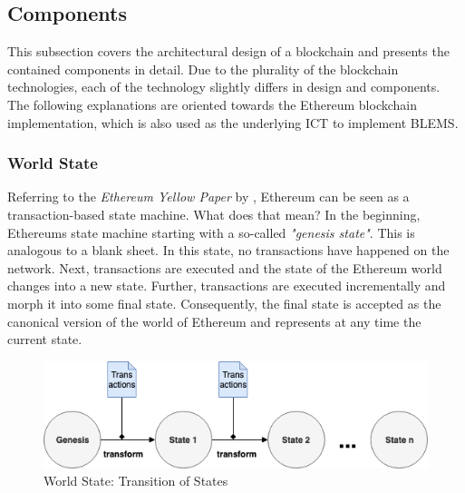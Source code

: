 \subsection{Components}
This subsection covers the architectural design of a blockchain and presents the 
contained components in detail. Due to the plurality of the blockchain technologies, 
each of the technology slightly differs in design and components. 
The following explanations are oriented towards the Ethereum blockchain 
implementation, which is also used as the underlying ICT to implement 
BLEMS.

\subsubsection{World State}
\label{sec:world_state}
Referring to the \textit{Ethereum Yellow Paper} by , Ethereum 
can be seen as a transaction-based state machine. What does that mean? 
In the beginning, Ethereums state machine starting with a so-called 
\textit{"genesis state"}. This is analogous to a blank sheet. 
In this state, no transactions have happened on the network. 
Next, transactions are executed and the state of the Ethereum world 
changes into a new state. Further, transactions are executed incrementally 
and morph it into some final state. Consequently, the final state 
is accepted as the canonical version of the world of Ethereum and 
represents at any time the current state.

\begin{figure}[htbp]
	\centering
	\includegraphics[width=.75\linewidth]{./figures/state_transition.png}
	\caption{World State: Transition of States}
	\label{figure:state_transition}
\end{figure}

